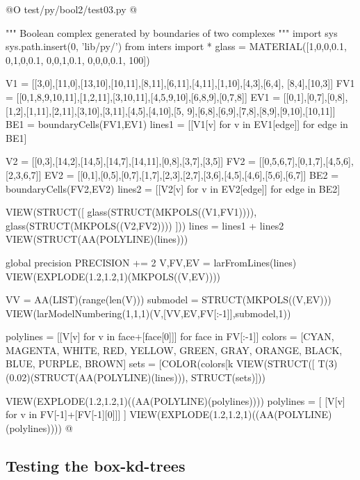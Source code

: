 \documentclass[11pt,oneside]{article}    %
\begin{document}
@O test/py/bool2/test03.py
@{""" Boolean complex generated by boundaries of two complexes """
import sys
sys.path.insert(0, 'lib/py/')
from inters import *
glass = MATERIAL([1,0,0,0.1,  0,1,0,0.1,  0,0,1,0.1, 0,0,0,0.1, 100])

V1 = [[3,0],[11,0],[13,10],[10,11],[8,11],[6,11],[4,11],[1,10],[4,3],[6,4],
        [8,4],[10,3]]
FV1 = [[0,1,8,9,10,11],[1,2,11],[3,10,11],[4,5,9,10],[6,8,9],[0,7,8]]
EV1 = [[0,1],[0,7],[0,8],[1,2],[1,11],[2,11],[3,10],[3,11],[4,5],[4,10],[5,
        9],[6,8],[6,9],[7,8],[8,9],[9,10],[10,11]]
BE1 = boundaryCells(FV1,EV1)
lines1 = [[V1[v] for v in EV1[edge]] for edge in BE1]

V2 = [[0,3],[14,2],[14,5],[14,7],[14,11],[0,8],[3,7],[3,5]]
FV2 = [[0,5,6,7],[0,1,7],[4,5,6],[2,3,6,7]]
EV2 = [[0,1],[0,5],[0,7],[1,7],[2,3],[2,7],[3,6],[4,5],[4,6],[5,6],[6,7]]
BE2 = boundaryCells(FV2,EV2)
lines2 = [[V2[v] for v in EV2[edge]] for edge in BE2]

VIEW(STRUCT([ glass(STRUCT(MKPOLS((V1,FV1)))), glass(STRUCT(MKPOLS((V2,FV2)))) ]))
lines = lines1 + lines2
VIEW(STRUCT(AA(POLYLINE)(lines)))

global precision
PRECISION += 2
V,FV,EV = larFromLines(lines)
VIEW(EXPLODE(1.2,1.2,1)(MKPOLS((V,EV))))

VV = AA(LIST)(range(len(V)))
submodel = STRUCT(MKPOLS((V,EV)))
VIEW(larModelNumbering(1,1,1)(V,[VV,EV,FV[:-1]],submodel,1))

polylines = [[V[v] for v in face+[face[0]]] for face in FV[:-1]]
colors = [CYAN, MAGENTA, WHITE, RED, YELLOW, GREEN, GRAY, ORANGE, BLACK, BLUE, PURPLE, BROWN]
sets = [COLOR(colors[k%
VIEW(STRUCT([ T(3)(0.02)(STRUCT(AA(POLYLINE)(lines))), STRUCT(sets)]))

VIEW(EXPLODE(1.2,1.2,1)((AA(POLYLINE)(polylines))))
polylines = [ [V[v] for v in FV[-1]+[FV[-1][0]]] ]
VIEW(EXPLODE(1.2,1.2,1)((AA(POLYLINE)(polylines))))
@}



\subsection{Testing the box-kd-trees}
\end{document}

